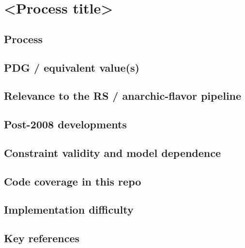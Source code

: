 
\section{<Process title>}

\subsection*{Process}

\subsection*{PDG / equivalent value(s)}

\subsection*{Relevance to the RS / anarchic-flavor pipeline}

\subsection*{Post-2008 developments}

\subsection*{Constraint validity and model dependence}

\subsection*{Code coverage in this repo}

\subsection*{Implementation difficulty}

\subsection*{Key references}
